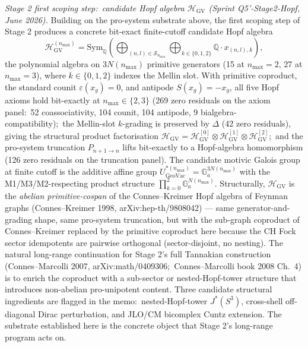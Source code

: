 \documentclass[11pt,a4paper]{article}
\theoremstyle{plain}
\theoremstyle{definition}
\newcommand{\sthree}{S^{3}}
\newcommand{\Q}{\mathbb{Q}}
\begin{document}
\emph{Stage 2 first scoping step:\ candidate Hopf algebra
$\mathcal{H}_{\mathrm{GV}}$ (Sprint Q5'-Stage2-Hopf, June 2026).}  Building on the
pro-system substrate above, the first scoping step of Stage 2 produces
a concrete bit-exact finite-cutoff candidate Hopf algebra
\[
\mathcal{H}_{\mathrm{GV}}^{(n_{\max})} = \mathrm{Sym}_{\Q}\!\left(\bigoplus_{(n, l) \in \mathcal{S}_{n_{\max}}}\bigoplus_{k \in \{0, 1, 2\}} \Q\cdot x_{(n, l), k}\right),
\]
the polynomial algebra on $3 N(n_{\max})$ primitive generators (15 at
$n_{\max} = 2$, 27 at $n_{\max} = 3$), where $k \in \{0, 1, 2\}$ indexes
the Mellin slot.  With primitive coproduct, the standard counit
$\varepsilon(x_g) = 0$, and antipode $S(x_g) = -x_g$, all five Hopf
axioms hold bit-exactly at $n_{\max} \in \{2, 3\}$ (269 zero residuals
on the axiom panel:\ 52 coassociativity, 104 counit, 104 antipode, 9
bialgebra-compatibility);\ the Mellin-slot $k$-grading is preserved by
$\Delta$ (42 zero residuals), giving the structural product
factorisation $\mathcal{H}_{\mathrm{GV}} = \mathcal{H}_{\mathrm{GV}}^{[0]}
\otimes \mathcal{H}_{\mathrm{GV}}^{[1]} \otimes \mathcal{H}_{\mathrm{GV}}^{[2]}$;\
and the pro-system truncation $P_{n+1 \to n}$ lifts bit-exactly to a
Hopf-algebra homomorphism (126 zero residuals on the truncation panel).
The candidate motivic Galois group at finite cutoff is the additive
affine group $U^{*(n_{\max})}_{\mathrm{GeoVac}} = \mathbb{G}_a^{3 N(n_{\max})}$
with the M1/M3/M2-respecting product structure
$\prod_{k = 0}^{2} \mathbb{G}_a^{N(n_{\max})}$.  Structurally,
$\mathcal{H}_{\mathrm{GV}}$ is the \emph{abelian primitive-cospan} of
the Connes--Kreimer Hopf algebra of Feynman graphs (Connes--Kreimer
1998, arXiv:hep-th/9808042) --- same generator-and-grading shape, same
pro-system truncation, but with the sub-graph coproduct of
Connes--Kreimer replaced by the primitive coproduct here because the CH
Fock sector idempotents are pairwise orthogonal (sector-disjoint, no
nesting).  The natural long-range continuation for Stage 2's full
Tannakian construction (Connes--Marcolli 2007, arXiv:math/0409306;\
Connes--Marcolli book 2008 Ch.~4) is to enrich the coproduct with a
sub-sector or nested-Hopf-tower structure that introduces non-abelian
pro-unipotent content.  Three candidate structural ingredients are
flagged in the memo:\ nested-Hopf-tower $J^*(\sthree)$, cross-shell
off-diagonal Dirac perturbation, and JLO/CM bicomplex Cuntz extension.
The substrate established here is the concrete object that Stage 2's
long-range program acts on.
\end{document}
